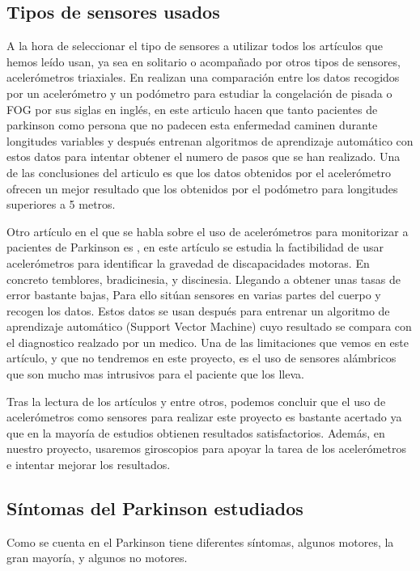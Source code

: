 \documentclass[11pt,spanish]{article}
\begin{document}
\subsection{Tipos de sensores usados}
A la hora de seleccionar el tipo de sensores a utilizar todos los artículos que hemos leído usan, ya sea en solitario o acompañado por otros tipos de sensores, acelerómetros triaxiales. En \cite{resumen3} realizan una comparación entre los datos recogidos por un acelerómetro y un podómetro para estudiar la congelación de pisada o FOG por sus siglas en inglés, en este articulo hacen que tanto pacientes de parkinson como persona que no padecen esta enfermedad caminen durante longitudes variables y después entrenan algoritmos de aprendizaje automático con estos datos para intentar obtener el numero de pasos que se han realizado. Una de las conclusiones del articulo es que los datos obtenidos por el acelerómetro ofrecen un mejor resultado que los obtenidos por el podómetro para longitudes superiores a 5 metros. 
\newline

Otro artículo en el que se habla sobre el uso de acelerómetros para monitorizar a pacientes de Parkinson es \cite{resumen4}, en este artículo se estudia la factibilidad de usar acelerómetros para identificar la gravedad de discapacidades motoras. En concreto temblores, bradicinesia, y discinesia. Llegando a obtener unas tasas de error bastante bajas, Para ello sitúan sensores en varias partes del cuerpo y recogen los datos. Estos datos se usan después para entrenar un algoritmo de aprendizaje automático (Support Vector Machine) cuyo resultado se compara con el diagnostico realzado por un medico. Una de las limitaciones que vemos en este artículo, y que no tendremos en este proyecto, es el uso de sensores alámbricos que son mucho mas intrusivos para el paciente que los lleva.

Tras la lectura de los artículos \cite{resumen3} y \cite{resumen4} entre otros, podemos concluir que el uso de acelerómetros como sensores para realizar este proyecto es bastante acertado ya que en la mayoría de estudios obtienen resultados satisfactorios. Además, en nuestro proyecto, usaremos giroscopios para apoyar la tarea de los acelerómetros e intentar mejorar los resultados.

\subsection{Síntomas del Parkinson estudiados}
Como se cuenta en \cite{resumen2} el Parkinson tiene diferentes síntomas, algunos motores, la gran mayoría, y algunos no motores. 
\newline
\end{document}
